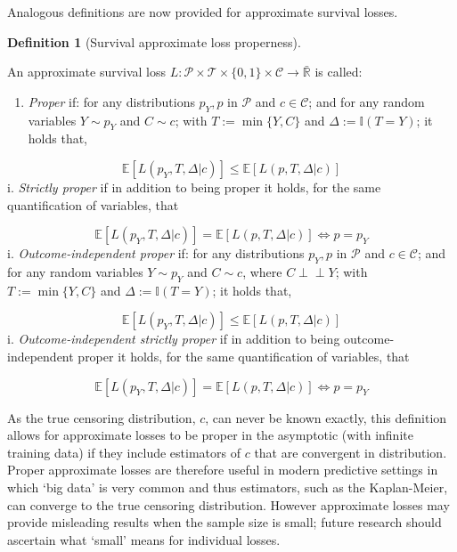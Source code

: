 \documentclass[
  letterpaper,
]{scrbook}
\providecommand{\tightlist}{%
  \setlength{\itemsep}{0pt}\setlength{\parskip}{0pt}}\usepackage{longtable,booktabs,array}
\theoremstyle{plain}
\theoremstyle{definition}
\newtheorem{definition}{Definition}[chapter]
\theoremstyle{remark}
\begin{document}
Analogous definitions are now provided for approximate survival losses.

\leavevmode{}%
\begin{definition}[Survival approximate loss
properness]\label{def-surv-approx-proper}

An approximate survival loss
\(L: \mathcal{P}\times \mathcal{T}\times \{0,1\}\times \mathcal{C}\rightarrow \bar{\mathbb{R}}\)
is called:

\begin{enumerate}
\def\labelenumi{\roman{enumi}.}
\tightlist
\item
  \emph{Proper} if: for any distributions \(p_Y, p\) in \(\mathcal{P}\)
  and \(c \in \mathcal{C}\); and for any random variables \(Y \sim p_Y\)
  and \(C \sim c\); with \(T := \min\{Y,C\}\) and
  \(\Delta := \mathbb{I}(T=Y)\); it holds that,
\end{enumerate}

\[
\mathbb{E}[L(p_Y, T, \Delta|c)] \leq \mathbb{E}[L(p, T, \Delta|c)]
\] i. \emph{Strictly proper} if in addition to being proper it holds,
for the same quantification of variables, that

\[
\mathbb{E}[L(p_Y, T, \Delta|c)] = \mathbb{E}[L(p, T, \Delta|c)] \Leftrightarrow p = p_Y
\] i. \emph{Outcome-independent proper} if: for any distributions
\(p_Y, p\) in \(\mathcal{P}\) and \(c \in \mathcal{C}\); and for any
random variables \(Y \sim p_Y\) and \(C \sim c\), where
\(C \perp \!\!\! \perp Y\); with \(T := \min\{Y,C\}\) and
\(\Delta := \mathbb{I}(T=Y)\); it holds that,

\[
\mathbb{E}[L(p_Y, T, \Delta|c)] \leq \mathbb{E}[L(p, T, \Delta|c)]
\] i. \emph{Outcome-independent strictly proper} if in addition to being
outcome-independent proper it holds, for the same quantification of
variables, that

\[
\mathbb{E}[L(p_Y, T, \Delta|c)] = \mathbb{E}[L(p, T, \Delta|c)] \Leftrightarrow p = p_Y
\]

\end{definition}

As the true censoring distribution, \(c\), can never be known exactly,
this definition allows for approximate losses to be proper in the
asymptotic (with infinite training data) if they include estimators of
\(c\) that are convergent in distribution. Proper approximate losses are
therefore useful in modern predictive settings in which `big data' is
very common and thus estimators, such as the Kaplan-Meier, can converge
to the true censoring distribution. However approximate losses may
provide misleading results when the sample size is small; future
research should ascertain what `small' means for individual losses.
\end{document}
